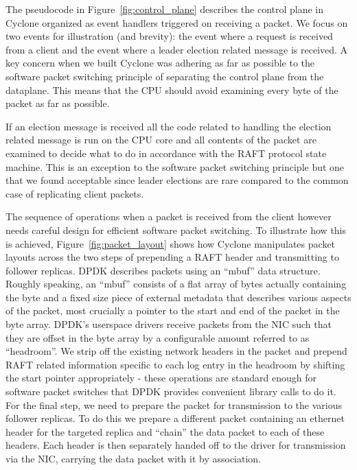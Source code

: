 \documentclass[10pt, preprint, nonatbib]{sigplanconf}
\begin{document}
The pseudocode in Figure~\ref{fig:control_plane} describes the control plane in
Cyclone organized as event handlers triggered on receiving a packet. We focus on
two events for illustration (and brevity): the event where a request is received
from a client and the event where a leader election related message is
received. A key concern when we built Cyclone was adhering as far as possible to
the software packet switching principle of separating the control plane from the
dataplane. This means that the CPU should avoid examining every byte of the
packet as far as possible.

If an election message is received all the code related to handling
the election related message is run on the CPU core and all contents of the
packet are examined to decide what to do in accordance with the RAFT protocol
state machine. This is an exception to the software packet switching principle
but one that we found acceptable since leader elections are rare compared to the
common case of replicating client packets.

The sequence of operations when a packet is received from the client however
needs careful design for efficient software packet switching. To illustrate how
this is achieved, Figure~\ref{fig:packet_layout} shows how Cyclone manipulates
packet layouts across the two steps of prepending a RAFT header and transmitting
to follower replicas. DPDK describes packets using an ``mbuf'' data
structure. Roughly speaking, an ``mbuf'' consists of a flat array of bytes
actually containing the byte and a fixed size piece of external metadata that
describes various aspects of the packet, most crucially a pointer to the start
and end of the packet in the byte array. DPDK's userspace drivers receive
packets from the NIC such that they are offset in the byte array by a
configurable amount referred to as ``headroom''. We strip off the existing
network headers in the packet and prepend RAFT related information specific to
each log entry in the headroom by shifting the start pointer appropriately -
these operations are standard enough for software packet switches that DPDK
provides convenient library calls to do it. For the final step, we need to
prepare the packet for transmission to the various follower replicas. To do this
we prepare a different packet containing an ethernet header for the targeted
replica and ``chain'' the data packet to each of these headers. Each header is
then separately handed off to the driver for transmission via the NIC, carrying
the data packet with it by association.
\end{document}
